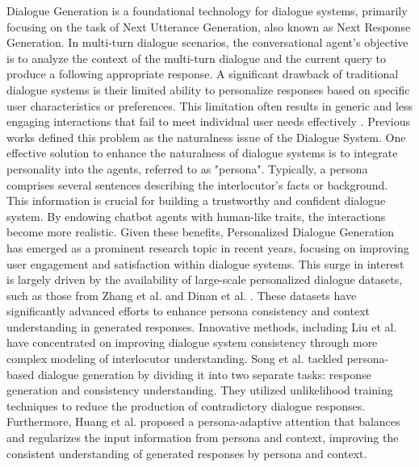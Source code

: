\documentclass[letterpaper]{article} %
\begin{document}
Dialogue Generation is a foundational technology for dialogue systems, primarily focusing on the task of Next Utterance Generation, also known as Next Response Generation. In multi-turn dialogue scenarios, the conversational agent's objective is to analyze the context of the multi-turn dialogue and the current query to produce a following appropriate response. A significant drawback of traditional dialogue systems is their limited ability to personalize responses based on specific user characteristics or preferences. This limitation often results in generic and less engaging interactions that fail to meet individual user needs effectively \cite{jiang-de-rijke-2018-sequence}. Previous works \cite{song-etal-2020-generating, warren-2006-features} defined this problem as the naturalness issue of the Dialogue System. One effective solution to enhance the naturalness of dialogue systems is to integrate personality into the agents, referred to as "persona". Typically, a persona comprises several sentences describing the interlocutor's facts or background. This information is crucial for building a trustworthy and confident dialogue system. By endowing chatbot agents with human-like traits, the interactions become more realistic. Given these benefits, Personalized Dialogue Generation has emerged as a prominent research topic in recent years, focusing on improving user engagement and satisfaction within dialogue systems. This surge in interest is largely driven by the availability of large-scale personalized dialogue datasets, such as those from Zhang et al. \cite{zhang-etal-2018-personalizing} and Dinan et al. \cite{dinan-etal-2019-convai2}. These datasets have significantly advanced efforts to enhance persona consistency and context understanding in generated responses. Innovative methods, including Liu et al. \cite{liu-etal-2020-impress} have concentrated on improving dialogue system consistency through more complex modeling of interlocutor understanding. Song et al. \cite{song-etal-2021-bob} tackled persona-based dialogue generation by dividing it into two separate tasks: response generation and consistency understanding. They utilized unlikelihood training techniques to reduce the production of contradictory dialogue responses. Furthermore, Huang et al. \cite{huang-etal-2023-paa} proposed a persona-adaptive attention that balances and regularizes the input information from persona and context, improving the consistent understanding of generated responses by persona and context.

\end{document}
